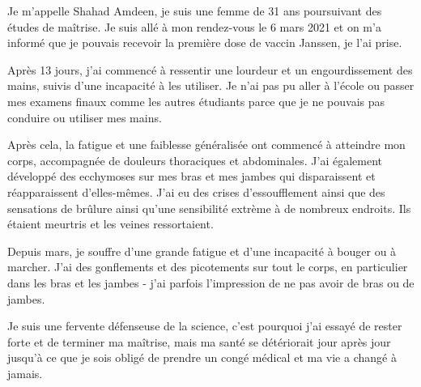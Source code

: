 Je m'appelle Shahad Amdeen, je suis une femme de 31 ans poursuivant des études
de maîtrise. Je suis allé à mon rendez-vous le 6 mars 2021 et on m'a informé que
je pouvais recevoir la première dose de vaccin Janssen, je l'ai prise.

Après 13 jours, j'ai commencé à ressentir une lourdeur et un engourdissement des
mains, suivis d'une incapacité à les utiliser. Je n'ai pas pu aller à l'école ou
passer mes examens finaux comme les autres étudiants parce que je ne pouvais pas
conduire ou utiliser mes mains.

Après cela, la fatigue et une faiblesse généralisée ont commencé à atteindre mon
corps, accompagnée de douleurs thoraciques et abdominales. J'ai également
développé des ecchymoses sur mes bras et mes jambes qui disparaissent et
réapparaissent d'elles-mêmes. J'ai eu des crises d'essoufflement ainsi que des
sensations de brûlure ainsi qu'une sensibilité extrème à de nombreux
endroits. Ils étaient meurtris et les veines ressortaient.

Depuis mars, je souffre d'une grande fatigue et d'une incapacité à bouger ou à
marcher. J'ai des gonflements et des picotements sur tout le corps, en
particulier dans les bras et les jambes - j'ai parfois l'impression de ne pas
avoir de bras ou de jambes.

Je suis une fervente défenseuse de la science, c'est pourquoi j'ai essayé de
rester forte et de terminer ma maîtrise, mais ma santé se détériorait jour après
jour jusqu'à ce que je sois obligé de prendre un congé médical et ma vie a
changé à jamais.
